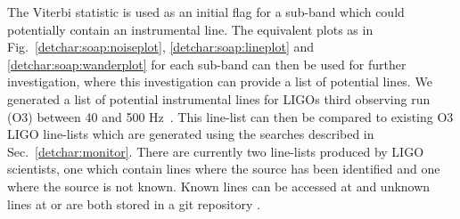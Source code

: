 \clearpage

The Viterbi statistic is used as an initial flag for a sub-band which could
potentially contain an instrumental line.  The equivalent plots as
in~ Fig.~\ref{detchar:soap:noiseplot},
\ref{detchar:soap:lineplot} and \ref{detchar:soap:wanderplot} for each sub-band
can then be used for further investigation, where this investigation can
provide a list of potential lines.  We~ generated a list of
potential instrumental lines for \glspl{LIGO} third observing run (O3) between
40 and 500 Hz~.  This line-list
can then be compared to existing O3 \gls{LIGO} line-lists which are generated
using the searches described in Sec.~\ref{detchar:monitor}.  There are
currently two line-lists produced by \gls{LIGO} scientists, one which contain
lines where the source has been identified and one where the source is not
known.  Known lines can be accessed at \citep{goetzKnownO3}
and unknown lines at \citep{goetzUnknownO3}
or are both stored in a git repository \citep{goetzLinesGit}.

